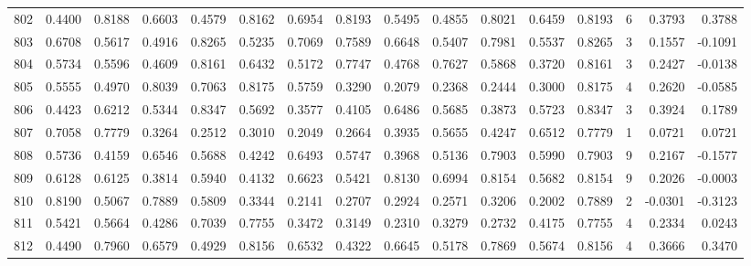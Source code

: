 \begin{tabular}{lrrrrrrrrrrrrrrr}
802 &      0.4400 &  0.8188 &  0.6603 &  0.4579 &  0.8162 &  0.6954 &  0.8193 &  0.5495 &  0.4855 &  0.8021 &   0.6459 &     0.8193 &      6 &                    0.3793 &                     0.3788 \\
803 &      0.6708 &  0.5617 &  0.4916 &  0.8265 &  0.5235 &  0.7069 &  0.7589 &  0.6648 &  0.5407 &  0.7981 &   0.5537 &     0.8265 &      3 &                    0.1557 &                    -0.1091 \\
804 &      0.5734 &  0.5596 &  0.4609 &  0.8161 &  0.6432 &  0.5172 &  0.7747 &  0.4768 &  0.7627 &  0.5868 &   0.3720 &     0.8161 &      3 &                    0.2427 &                    -0.0138 \\
805 &      0.5555 &  0.4970 &  0.8039 &  0.7063 &  0.8175 &  0.5759 &  0.3290 &  0.2079 &  0.2368 &  0.2444 &   0.3000 &     0.8175 &      4 &                    0.2620 &                    -0.0585 \\
806 &      0.4423 &  0.6212 &  0.5344 &  0.8347 &  0.5692 &  0.3577 &  0.4105 &  0.6486 &  0.5685 &  0.3873 &   0.5723 &     0.8347 &      3 &                    0.3924 &                     0.1789 \\
807 &      0.7058 &  0.7779 &  0.3264 &  0.2512 &  0.3010 &  0.2049 &  0.2664 &  0.3935 &  0.5655 &  0.4247 &   0.6512 &     0.7779 &      1 &                    0.0721 &                     0.0721 \\
808 &      0.5736 &  0.4159 &  0.6546 &  0.5688 &  0.4242 &  0.6493 &  0.5747 &  0.3968 &  0.5136 &  0.7903 &   0.5990 &     0.7903 &      9 &                    0.2167 &                    -0.1577 \\
809 &      0.6128 &  0.6125 &  0.3814 &  0.5940 &  0.4132 &  0.6623 &  0.5421 &  0.8130 &  0.6994 &  0.8154 &   0.5682 &     0.8154 &      9 &                    0.2026 &                    -0.0003 \\
810 &      0.8190 &  0.5067 &  0.7889 &  0.5809 &  0.3344 &  0.2141 &  0.2707 &  0.2924 &  0.2571 &  0.3206 &   0.2002 &     0.7889 &      2 &                   -0.0301 &                    -0.3123 \\
811 &      0.5421 &  0.5664 &  0.4286 &  0.7039 &  0.7755 &  0.3472 &  0.3149 &  0.2310 &  0.3279 &  0.2732 &   0.4175 &     0.7755 &      4 &                    0.2334 &                     0.0243 \\
812 &      0.4490 &  0.7960 &  0.6579 &  0.4929 &  0.8156 &  0.6532 &  0.4322 &  0.6645 &  0.5178 &  0.7869 &   0.5674 &     0.8156 &      4 &                    0.3666 &                     0.3470 \\

\end{tabular}
